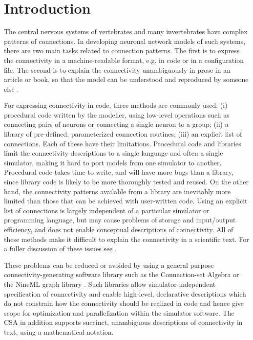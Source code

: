 \documentclass{frontiersSCNS} %
\begin{document}
\section{Introduction}

The central nervous systems of vertebrates and many invertebrates have
complex patterns of connections.  In developing neuronal network
models of such systems, there are two main tasks related to connection
patterns. The first is to express the connectivity in a
machine-readable format, e.g. in code or in a configuration file.  The
second is to explain the connectivity unambiguously in prose in an
article or book, so that the model can be understood and reproduced by
someone else \citep{nordlie-2009_e1000456}.

For expressing connectivity in code, three methods are commonly used:
(i) procedural code written by the modeller, using low-level
operations such as connecting pairs of neurons or connecting a single
neuron to a group; (ii) a library of pre-defined, parameterized
connection routines; (iii) an explicit list of connections.  Each of
these have their limitations.  Procedural code and libraries limit the
connectivity descriptions to a single language and often a single
simulator, making it hard to port models from one simulator to
another.  Procedural code takes time to write, and will have more bugs
than a library, since library code is likely to be more thoroughly
tested and reused.  On the other hand, the connectivity patterns
available from a library are inevitably more limited than those that
can be achieved with user-written code.  Using an explicit list of
connections is largely independent of a particular simulator or
programming language, but may cause problems of storage and
input/output efficiency, and does not enable conceptual descriptions
of connectivity.  All of these methods make it difficult to explain
the connectivity in a scientific text. For a fuller discussion of
these issues see \citet{crook12}.

These problems can be reduced or avoided by using a general purpose
connectivity-generating software library such as the Connection-set
Algebra \citep[CSA;][]{djurfeldt12} or the NineML graph library
\citep{raikov10}.  Such libraries allow simulator-independent
specification of connectivity and enable high-level, declarative
descriptions which do not constrain how the connectivity should be
realized in code and hence give scope for optimization and
parallelization within the simulator software.  The CSA in addition
supports succinct, unambiguous descriptions of connectivity in text,
using a mathematical notation.
\end{document}
